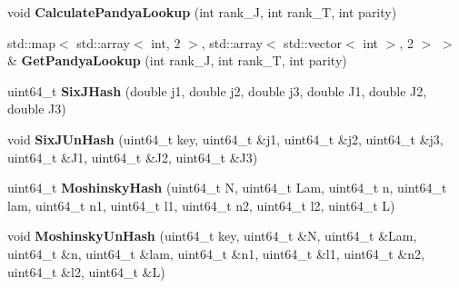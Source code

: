 \begin{DoxyCompactItemize}
\mbox{\label{classModelSpace_abe6a15d78c5a16e707a02e5d2341f1f0}} 
void {\bfseries Calculate\+Pandya\+Lookup} (int rank\+\_\+J, int rank\+\_\+T, int parity)
\item 
\mbox{\label{classModelSpace_aecdada15961c5bb0d4ead0db0a5a45e5}} 
std\+::map$<$ std\+::array$<$ int, 2 $>$, std\+::array$<$ std\+::vector$<$ int $>$, 2 $>$ $>$ \& {\bfseries Get\+Pandya\+Lookup} (int rank\+\_\+J, int rank\+\_\+T, int parity)
\item 
\mbox{\label{classModelSpace_a6727d45bfcee5a6aa9181da6802fc948}} 
uint64\+\_\+t {\bfseries Six\+J\+Hash} (double j1, double j2, double j3, double J1, double J2, double J3)
\item 
\mbox{\label{classModelSpace_a074b15f27c3c302e5594ce1bc03d774a}} 
void {\bfseries Six\+J\+Un\+Hash} (uint64\+\_\+t key, uint64\+\_\+t \&j1, uint64\+\_\+t \&j2, uint64\+\_\+t \&j3, uint64\+\_\+t \&J1, uint64\+\_\+t \&J2, uint64\+\_\+t \&J3)
\item 
\mbox{\label{classModelSpace_a5503bab63a0392cf5914fb897f623003}} 
uint64\+\_\+t {\bfseries Moshinsky\+Hash} (uint64\+\_\+t N, uint64\+\_\+t Lam, uint64\+\_\+t n, uint64\+\_\+t lam, uint64\+\_\+t n1, uint64\+\_\+t l1, uint64\+\_\+t n2, uint64\+\_\+t l2, uint64\+\_\+t L)
\item 
\mbox{\label{classModelSpace_a3b58b32f835092158b45b82101e4ad5a}} 
void {\bfseries Moshinsky\+Un\+Hash} (uint64\+\_\+t key, uint64\+\_\+t \&N, uint64\+\_\+t \&Lam, uint64\+\_\+t \&n, uint64\+\_\+t \&lam, uint64\+\_\+t \&n1, uint64\+\_\+t \&l1, uint64\+\_\+t \&n2, uint64\+\_\+t \&l2, uint64\+\_\+t \&L)
\end{DoxyCompactItemize}
